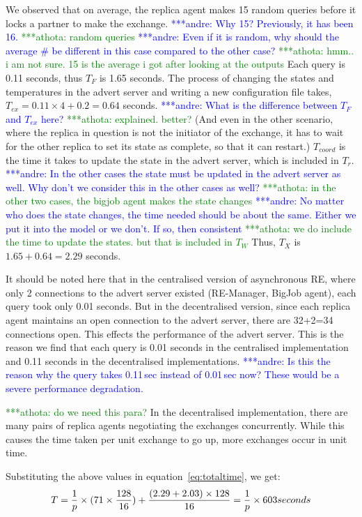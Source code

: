 \documentclass{rspublic}
\newcommand{\alnote}[1]{ {\textcolor{blue} { ***andre: #1 }}}
\newcommand{\athotanote}[1]{ {\textcolor{green} { ***athota: #1 }}}
\newcommand{\alnote}[1]{}
\newcommand{\athotanote}[1]{}
\begin{document}
{We observed that on average, the replica agent makes 15 random queries before
it locks a partner to make the exchange. \alnote{Why 15? Previously, it has been 16.} \athotanote{random queries} \alnote{Even if it is random, why should the average \# be different in this case compared to the other case?} \athotanote{hmm.. i am not sure. 15 is the average i got after looking at the outputs}
Each query is 0.11 seconds, thus $T_F$ is 1.65
seconds. The process of changing the states
and temperatures in the advert server and writing a new
configuration file takes, $T_{ex} = 0.11\times 4 +0.2 = 0.64$ seconds.
\alnote{What is the difference between $T_F$ and $T_{ex}$ here?} \athotanote{explained. better?}
(And even in the other scenario, where the replica in question is not the
initiator of the exchange, it has to wait for the other replica to set its state as complete, so that it can restart.) $T_{coord}$ is the time it takes to
update the state in the advert server, which is included in $T_r$. \alnote{In the other
cases the state must be updated in the advert server as well. Why don't we consider
this in the other cases as well?}\athotanote{in the other two cases, the bigjob agent makes the state changes} \alnote{No matter who does the state changes, the time needed should be about the same. Either we put it into the model or we don't. If so, then consistent} \athotanote{we do include the time to update the states. but that is included in $T_W$}  Thus, $T_{X}$ is $1.65+0.64= 2.29$ seconds.

It should be noted here that in the centralised version of
asynchronous RE, where only 2 connections to the advert server existed
(RE-Manager, BigJob agent), each query took only 0.01 seconds. But in
the decentralised version, since each replica agent maintains an open
connection to the advert server, there are 32+2=34 connections
open. This effects the performance of the advert server. This is the reason we find that each query is 0.01 seconds in the centralised implementation and 0.11 seconds in the decentralised implementations. \alnote{Is this the reason why
the query takes 0.11\,sec instead of 0.01\,sec now? These would be a severe performance
degradation.}

\athotanote{ do we need this para?}In the decentralised implementation, there are many pairs of
replica agents negotiating the exchanges concurrently. While this
causes the time taken per unit exchange to go up, more exchanges occur
in unit time.

Substituting the above values in equation~\ref{eq:totaltime}, we get:
\begin{eqnarray}
T=  {1 \over p} \times {{(71\times {128\over 16}}) + {(2.29+2.03)\times 128\over 16}} = {1 \over p} \times 603 seconds
\label{eq:decent}
\end{eqnarray}


}
\end{document}
